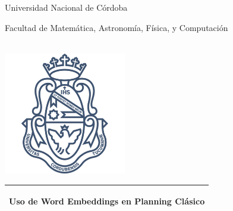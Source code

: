 \documentclass[a4paper,11pt,oneside]{book}
\begin{document}
    
    \frontmatter
    
    \begin{titlepage}      
        \begin{center}
			
			{\huge
    			Universidad Nacional de Córdoba
    			
    			\vspace{0.8cm}
    			
    			Facultad de Matemática, Astronomía, Física, y Computación
            }\\[1cm]
            \includegraphics[width=0.4\textwidth]{logo_unc.png}
            
			\vspace*{1cm}
			
			\begin{tabular}{@{}p{\textwidth}@{}}
            \toprule[2pt]
            \midrule
            \vspace{0.2cm}
            \begin{center}
            \Huge{\textbf{
            Uso de Word Embeddings en Planning Clásico%
            }}
            \end{center}
            \vspace{0.2cm}\\
            \midrule
            \toprule[2pt]
            \end{tabular}
            

\end{center}
\end{titlepage}
\end{document}
